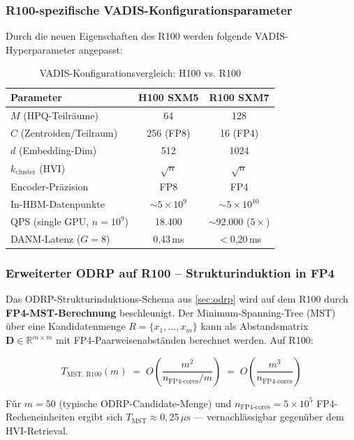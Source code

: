 ﻿\documentclass[12pt,a4paper]{article}
\begin{document}
\subsubsection{R100-spezifische VADIS-Konfigurationsparameter}

Durch die neuen Eigenschaften des R100 werden folgende
VADIS-Hyperparameter angepasst:

\begin{table}[ht]
\centering
\small
\caption{VADIS-Konfigurationsvergleich: H100 vs. R100}
\label{tab:config_compare}
\begin{tabular}{@{}lcc@{}}
\toprule
\textbf{Parameter} & \textbf{H100 SXM5} & \textbf{R100 SXM7} \\
\midrule
$M$ (HPQ-Teilräume) & 64 & 128 \\
$C$ (Zentroiden/Teilraum) & 256 (FP8) & 16 (FP4) \\
$d$ (Embedding-Dim) & 512 & 1024 \\
$k_{\text{cluster}}$ (HVI) & $\sqrt{n}$ & $\sqrt{n}$ \\
Encoder-Präzision & FP8 & FP4 \\
In-HBM-Datenpunkte & $\sim5\times10^9$ & $\sim5\times10^{10}$ \\
QPS (single GPU, $n=10^9$) & 18.400 & $\sim$92.000 ($5\times$) \\
DANM-Latenz ($G=8$) & 0,43\,ms & $<$0,20\,ms \\
\bottomrule
\end{tabular}
\end{table}

\subsubsection{Erweiterter ODRP auf R100 -- Strukturinduktion in FP4}

Das ODRP-Strukturinduktions-Schema aus \cref{sec:odrp}
wird auf dem R100 durch \textbf{FP4-MST-Berechnung} beschleunigt.
Der Minimum-Spanning-Tree (MST) über eine Kandidatenmenge
$R = \{x_1, \ldots, x_m\}$ kann als Abstandsmatrix
$\mathbf{D} \in \mathbb{R}^{m \times m}$ mit FP4-Paarweisenabständen
berechnet werden. Auf R100:

\begin{equation}
  T_{\text{MST, R100}}(m) \;=\; O\!\left(\frac{m^2}{n_{\text{FP4-cores}} / m}\right)
  \;=\; O\!\left(\frac{m^3}{n_{\text{FP4-cores}}}\right)
\end{equation}

Für $m = 50$ (typische ODRP-Candidate-Menge) und
$n_{\text{FP4-cores}} = 5 \times 10^5$ FP4-Recheneinheiten
ergibt sich $T_{\text{MST}} \approx 0{,}25\,\mu\text{s}$
--- vernachlässigbar gegenüber dem HVI-Retrieval.
\end{document}

